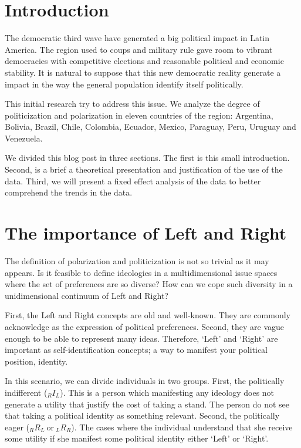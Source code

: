 \documentclass[10pt]{article}
\begin{document}
\section{Introduction}

The democratic third wave have generated a big political impact in Latin America. The region used to coups and military rule gave room to vibrant democracies with competitive elections and reasonable political and economic stability.  It is natural to suppose that this new democratic reality generate a impact in the way the general population identify itself politically.

This initial research try to address this issue. We analyze the degree of politicization and polarization in eleven countries of the region: Argentina, Bolivia, Brazil, Chile, Colombia, Ecuador, Mexico, Paraguay, Peru, Uruguay and Venezuela. 

We divided this blog post in three sections. The first is this small introduction. Second, is a brief a theoretical presentation and justification of the use of the data. Third, we will present a fixed effect analysis of the data to better comprehend the trends in the data. 

\section{The importance of Left and Right}

The definition of polarization and politicization is not so trivial as it may appears. Is it feasible to define ideologies in a multidimensional issue spaces where the set of preferences are so diverse? How can we cope such diversity in a unidimensional continuum of Left and Right?

First, the Left and Right concepts are old and well-known. They are commonly acknowledge as the expression of political preferences. Second, they are vague enough to be able to represent many ideas. Therefore, `Left' and `Right' are important as self-identification concepts; a way to manifest your political position, identity.

In this scenario, we can divide individuals in two groups. First, the politically indifferent ($_{R}I_{L}$). This is a person which manifesting any ideology does not generate a utility that justify the cost of taking a stand. The person do not see that taking a political identity as something relevant. Second, the politically eager ($_{R}R_{L} \ \textrm{or} \ _{L}R_{R}$). The cases where the individual understand that she receive some utility if she manifest some political identity either `Left' or `Right'.  
\end{document}
